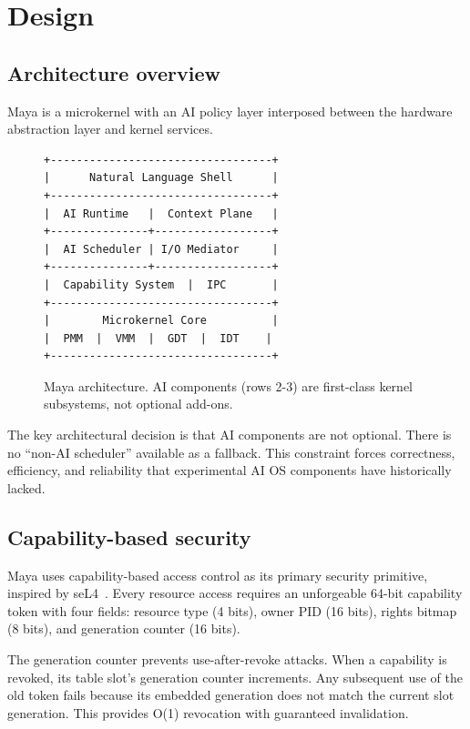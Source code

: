 \documentclass[letterpaper,twocolumn,10pt]{article}
\begin{document}
\section{Design}

\subsection{Architecture overview}

Maya is a microkernel with an AI policy layer
interposed between the hardware abstraction
layer and kernel services.

\begin{figure}[h]
\begin{verbatim}
+----------------------------------+
|      Natural Language Shell      |
+----------------------------------+
|  AI Runtime   |  Context Plane   |
+---------------+------------------+
|  AI Scheduler | I/O Mediator     |
+---------------+------------------+
|  Capability System  |  IPC       |
+----------------------------------+
|        Microkernel Core          |
|  PMM  |  VMM  |  GDT  |  IDT    |
+----------------------------------+
\end{verbatim}
\caption{Maya architecture. AI components (rows 2-3)
are first-class kernel subsystems, not optional
add-ons.}
\end{figure}

The key architectural decision is that AI
components are not optional. There is no
``non-AI scheduler'' available as a fallback.
This constraint forces correctness, efficiency,
and reliability that experimental AI OS
components have historically lacked.

\subsection{Capability-based security}

Maya uses capability-based access control as
its primary security primitive, inspired by
seL4~\cite{sel4}. Every resource access requires
an unforgeable 64-bit capability token with
four fields: resource type (4 bits), owner PID
(16 bits), rights bitmap (8 bits), and generation
counter (16 bits).

The generation counter prevents use-after-revoke
attacks. When a capability is revoked, its table
slot's generation counter increments. Any
subsequent use of the old token fails because
its embedded generation does not match the
current slot generation. This provides O(1)
revocation with guaranteed invalidation.
\end{document}
